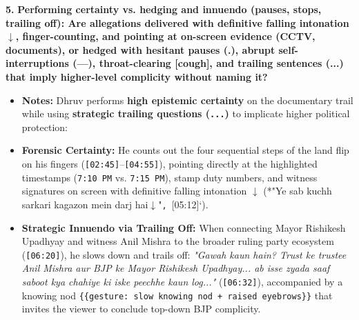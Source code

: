 \documentclass[10pt,a4paper]{article}
\begin{document}
\noindent\textbf{5.} \textbf{Performing certainty vs. hedging and innuendo (pauses, stops, trailing off): Are allegations delivered with definitive falling intonation $\downarrow$, finger-counting, and pointing at on-screen evidence (CCTV, documents), or hedged with hesitant pauses (.), abrupt self-interruptions (---), throat-clearing [cough], and trailing sentences (...) that imply higher-level complicity without naming it?}\par\smallskip
\begin{itemize}
  \item \textbf{Notes:}
Dhruv performs \textbf{high epistemic certainty} on the documentary trail while using \textbf{strategic trailing questions (\texttt{...})} to implicate higher political protection:\par\smallskip
  \item \textbf{Forensic Certainty:} He counts out the four sequential steps of the land flip on his fingers (\texttt{[02:45]}--\texttt{[04:55]}), pointing directly at the highlighted timestamps (\texttt{7:10 PM} vs. \texttt{7:15 PM}), stamp duty numbers, and witness signatures on screen with definitive falling intonation \texttt{$\downarrow$} (*"Ye sab kuchh sarkari kagazon mein darj hai$\downarrow$"\texttt{, }[05:12]`).
  \item \textbf{Strategic Innuendo via Trailing Off:} When connecting Mayor Rishikesh Upadhyay and witness Anil Mishra to the broader ruling party ecosystem (\texttt{[06:20]}), he slows down and trails off: \textit{"Gawah kaun hain? Trust ke trustee Anil Mishra aur BJP ke Mayor Rishikesh Upadhyay... ab isse zyada saaf saboot kya chahiye ki iske peechhe kaun log..."} (\texttt{[06:32]}), accompanied by a knowing nod \texttt{\{\{gesture: slow knowing nod + raised eyebrows\}\}} that invites the viewer to conclude top-down BJP complicity.
\end{itemize}
\end{document}
